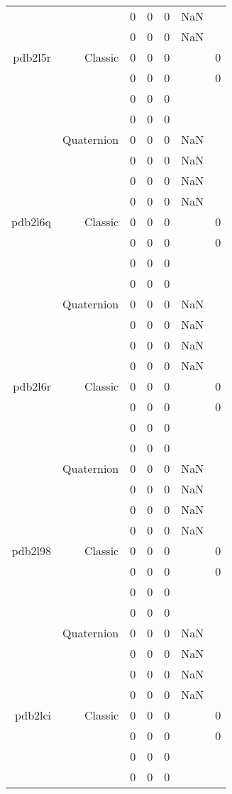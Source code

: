 \begin{xltabular}{\textwidth}{r|rcccSc}
& & 0 & 0 & 0 & NaN & \\
& & 0 & 0 & 0 & NaN & \\ \addlinespace
pdb2l5r & Classic & 0 & 0 & 0 & & 0 \\
& & 0 & 0 & 0 & & 0 \\
& & 0 & 0 & 0 & & \\
& & 0 & 0 & 0 & & \\
& Quaternion & 0 & 0 & 0 & NaN & \\
& & 0 & 0 & 0 & NaN & \\
& & 0 & 0 & 0 & NaN & \\
& & 0 & 0 & 0 & NaN & \\ \addlinespace
pdb2l6q & Classic & 0 & 0 & 0 & & 0 \\
& & 0 & 0 & 0 & & 0 \\
& & 0 & 0 & 0 & & \\
& & 0 & 0 & 0 & & \\
& Quaternion & 0 & 0 & 0 & NaN & \\
& & 0 & 0 & 0 & NaN & \\
& & 0 & 0 & 0 & NaN & \\
& & 0 & 0 & 0 & NaN & \\ \addlinespace
pdb2l6r & Classic & 0 & 0 & 0 & & 0 \\
& & 0 & 0 & 0 & & 0 \\
& & 0 & 0 & 0 & & \\
& & 0 & 0 & 0 & & \\
& Quaternion & 0 & 0 & 0 & NaN & \\
& & 0 & 0 & 0 & NaN & \\
& & 0 & 0 & 0 & NaN & \\
& & 0 & 0 & 0 & NaN & \\ \addlinespace
pdb2l98 & Classic & 0 & 0 & 0 & & 0 \\
& & 0 & 0 & 0 & & 0 \\
& & 0 & 0 & 0 & & \\
& & 0 & 0 & 0 & & \\
& Quaternion & 0 & 0 & 0 & NaN & \\
& & 0 & 0 & 0 & NaN & \\
& & 0 & 0 & 0 & NaN & \\
& & 0 & 0 & 0 & NaN & \\ \addlinespace
pdb2lci & Classic & 0 & 0 & 0 & & 0 \\
& & 0 & 0 & 0 & & 0 \\
& & 0 & 0 & 0 & & \\
& & 0 & 0 & 0 & & \\

\end{xltabular}
